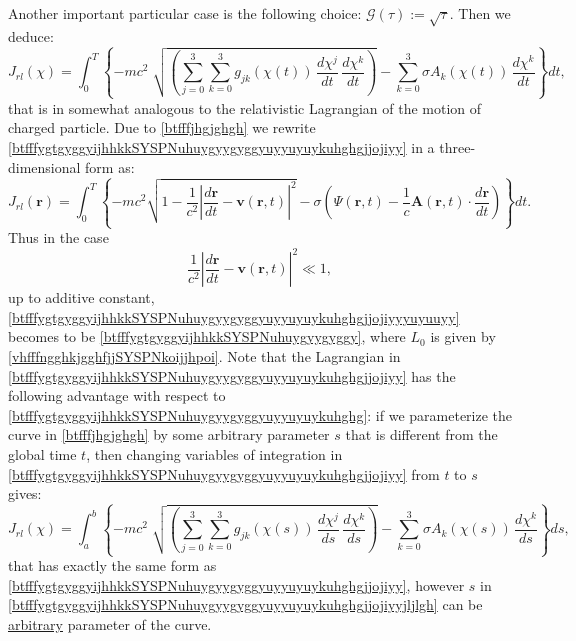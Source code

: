 \documentclass{article}
\theoremstyle{definition}
\theoremstyle{remark}
\renewcommand{\vec}[1]{\mathbf{#1}}
\newcommand{\er}{\eqref}
\newcommand{\er}{\eqref}
\begin{document}
Another important particular case is the following choice:
$\mathcal{G}(\tau):=\sqrt{\tau}$. Then we deduce:
\begin{equation}\label{btfffygtgyggyijhhkkSYSPNuhuygyygyggyuyyuyuykuhghgjjojiyy}
J_{rl}(\chi)=
\int_0^T\left\{-mc^2\;\sqrt{\left(\sum_{j=0}^{3}\sum_{k=0}^{3}g_{jk}\left(\chi(t)\right)\,\frac{d\chi^j}{dt}\,\frac{d\chi^k}{dt}\right)}-\sum_{k=0}^{3}\sigma
A_k\left(\chi(t)\right)\,\frac{d\chi^k}{dt}\right\}dt,
\end{equation}
that is in somewhat analogous to the relativistic Lagrangian of the
motion of charged particle. Due to \er{btfffjhgjghgh} we rewrite
\er{btfffygtgyggyijhhkkSYSPNuhuygyygyggyuyyuyuykuhghgjjojiyy} in a
three-dimensional form as:
\begin{equation}\label{btfffygtgyggyijhhkkSYSPNuhuygyygyggyuyyuyuykuhghgjjojiyyyuyuuyy}
J_{rl}(\vec r)= \int_0^T\left\{
-mc^2\sqrt{1-\frac{1}{c^2}\left|\frac{d\vec r}{dt}-\vec v(\vec
r,t)\right|^2}-\sigma\left(\Psi(\vec r,t)-\frac{1}{c}\vec A(\vec
r,t)\cdot\frac{d\vec r}{dt}\right)\right\}dt.
\end{equation}
Thus in the case
$$\frac{1}{c^2}\left|\frac{d\vec r}{dt}-\vec v(\vec
r,t)\right|^2\ll 1,$$ up to additive constant,
\er{btfffygtgyggyijhhkkSYSPNuhuygyygyggyuyyuyuykuhghgjjojiyyyuyuuyy}
becomes to be \er{btfffygtgyggyijhhkkSYSPNuhuygyygyggy}, where $L_0$
is given by \er{vhfffngghkjgghfjjSYSPNkoijjhpoi}. Note that the
Lagrangian in
\er{btfffygtgyggyijhhkkSYSPNuhuygyygyggyuyyuyuykuhghgjjojiyy} has
the following advantage with respect to
\er{btfffygtgyggyijhhkkSYSPNuhuygyygyggyuyyuyuykuhghg}: if we
parameterize the curve in \er{btfffjhgjghgh} by some arbitrary
parameter $s$ that is different from the global time $t$, then
changing variables of integration in
\er{btfffygtgyggyijhhkkSYSPNuhuygyygyggyuyyuyuykuhghgjjojiyy} from
$t$ to $s$ gives:
\begin{equation}\label{btfffygtgyggyijhhkkSYSPNuhuygyygyggyuyyuyuykuhghgjjojiyyjljlgh}
J_{rl}(\chi)=
\int_a^b\left\{-mc^2\;\sqrt{\left(\sum_{j=0}^{3}\sum_{k=0}^{3}g_{jk}\left(\chi(s)\right)\,\frac{d\chi^j}{ds}\,\frac{d\chi^k}{ds}\right)}-\sum_{k=0}^{3}\sigma
A_k\left(\chi(s)\right)\,\frac{d\chi^k}{ds}\right\}ds,
\end{equation}
that has exactly the same form as
\er{btfffygtgyggyijhhkkSYSPNuhuygyygyggyuyyuyuykuhghgjjojiyy},
however $s$ in
\er{btfffygtgyggyijhhkkSYSPNuhuygyygyggyuyyuyuykuhghgjjojiyyjljlgh}
can be \underline{arbitrary} parameter of the curve.
\end{document}
